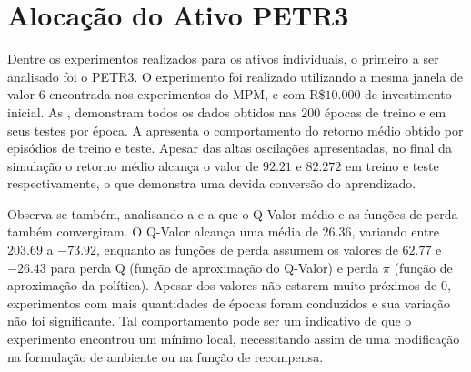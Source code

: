 \label{apendice:ativos}


\section{Alocação do Ativo PETR3}

Dentre os experimentos realizados para os ativos individuais, o primeiro a ser analisado foi o PETR3. O experimento foi realizado utilizando a mesma janela de valor $6$ encontrada nos experimentos do \acrshort{MPM}, e com R\$$10.000$ de investimento inicial. As , demonstram todos os dados obtidos nas 200 épocas de treino e em seus testes por época. A  apresenta o comportamento do retorno médio obtido por episódios de treino e teste. Apesar das altas oscilações apresentadas, no final da simulação o retorno médio alcança o valor de $92.21$ e $82.272$ em treino e teste respectivamente, o que demonstra uma devida conversão do aprendizado.


Observa-se também, analisando a  e a  que o Q-Valor médio e as funções de perda também convergiram. O Q-Valor alcança uma média de $26.36$, variando entre $203.69$ a $-73.92$, enquanto as funções de perda assumem os valores de $62.77$ e $-26.43$ para perda Q (função de aproximação do Q-Valor) e perda $\pi$ (função de aproximação da política). Apesar dos valores não estarem muito próximos de $0$, experimentos com mais quantidades de épocas foram conduzidos e sua variação não foi significante. Tal comportamento pode ser um indicativo de que o experimento encontrou um mínimo local, necessitando assim de uma modificação na formulação de ambiente ou na função de recompensa.

